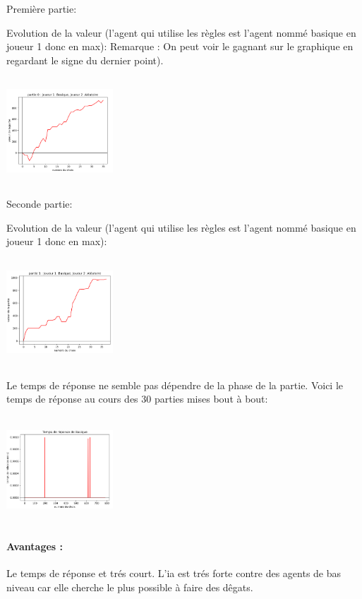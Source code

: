 				Première partie:

				Evolution de la valeur (l'agent qui utilise les règles est l'agent nommé basique en joueur 1 donc en max):
				Remarque : On peut voir le gagnant sur le graphique en regardant le signe du dernier point).

				\includegraphics[width=4cm,height=4cm]{graphiques/valeur_basique_alea1}

				Seconde partie:

				Evolution de la valeur (l'agent qui utilise les règles est l'agent nommé basique en joueur 1 donc en max):

				\includegraphics[width=4cm,height=4cm]{graphiques/valeur_basique_alea2}

				Le temps de réponse ne semble pas dépendre de la phase de la partie. Voici le temps de réponse au cours des 30 parties mises bout à bout:

				\includegraphics[width=4cm,height=4cm]{graphiques/temps_basique_alea1}

			\paragraph{Avantages :}
				Le temps de réponse et trés court. L'ia est trés forte contre des agents de bas niveau car elle cherche le plus possible à faire des dêgats.
